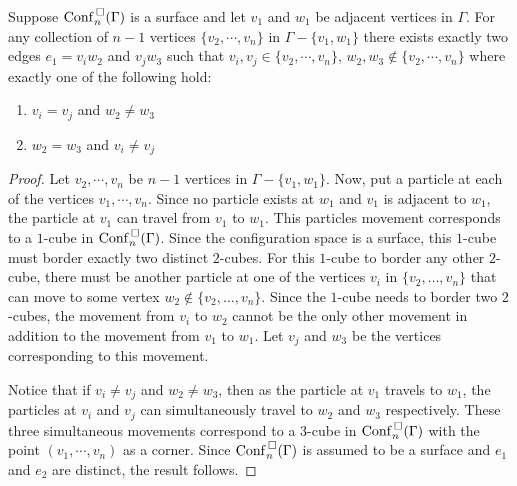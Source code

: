 \begin{lem}
    \label{lem:is_surface_1}
    Suppose \(\mathrm{Conf}^{\,\square}_n(\Gamma)\) is a surface and let \(v_1\) and \(w_1\) be adjacent vertices in \(\Gamma\).
    For any collection of \(n-1\) vertices \(\{v_2, \cdots, v_n\}\) in \(\Gamma - \{v_1, w_1\}\) there exists exactly two edges \(e_1 = v_i w_2\) and \(v_j w_3\)
    such that \(v_i, v_j \in \{v_2, \cdots, v_n\}\), \(w_2, w_3 \not \in \{v_2, \cdots, v_n\}\) where exactly one of the following hold:
    \begin{enumerate}
        \item \(v_i = v_j\) and \(w_2 \neq w_3\)
        \item \(w_2 = w_3\) and \(v_i \neq v_j\)
    \end{enumerate}
\end{lem}
\begin{proof}
    Let \(v_2, \cdots, v_n\) be \(n-1\) vertices in \(\Gamma - \{v_1, w_1\}\).   
    Now, put a particle at each of the vertices \(v_1, \cdots, v_n\).
    Since no particle exists at \(w_1\) and \(v_1\) is adjacent to \(w_1\), 
    the particle at \(v_1\) can travel from \(v_1\) to \(w_1\).
    This particles movement corresponds to a \(1\)-cube in \(\mathrm{Conf}^{\,\square}_n(\Gamma)\).
    Since the configuration space is a surface, this \(1\)-cube must border exactly two distinct \(2\)-cubes.
    For this \(1\)-cube to border any other \(2\)-cube,
    there must be another particle at one of the vertices \(v_i\) in \(\{v_2, \ldots, v_n\}\) that can move to some vertex
    \(w_2 \not \in \{v_2, \ldots, v_n\}\).
    Since the \(1\)-cube needs to border two \(2\)-cubes, the movement from \(v_i\) to \(w_2\) cannot be the only other movement in addition to
    the movement from \(v_1\) to \(w_1\). Let \(v_j\) and \(w_3\) be the vertices corresponding to this movement.
    
    Notice that if \(v_i \neq v_j\) and \(w_2 \neq w_3\), then as the particle at \(v_1\) travels to \(w_1\), the particles
    at \(v_i\) and \(v_j\) can simultaneously travel to \(w_2\) and \(w_3\) respectively. These three simultaneous movements correspond
    to a \(3\)-cube in \(\mathrm{Conf}^{\,\square}_n(\Gamma)\) with the point \((v_1, \cdots, v_n)\) as a corner.
    Since \(\mathrm{Conf}^{\,\square}_n(\Gamma)\) is assumed to be a surface and \(e_1\) and \(e_2\) are distinct, 
    the result follows.
\end{proof}

